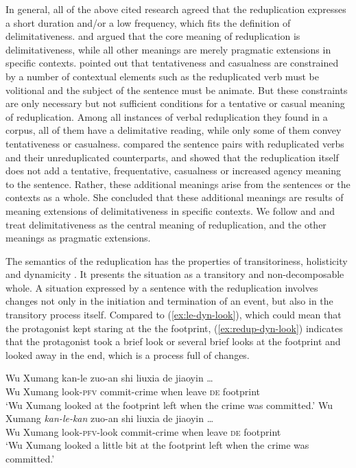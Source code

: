 In general, all of the above cited research agreed that the reduplication expresses a short duration and/or a low frequency, which fits the definition of delimitativeness.
\citet[152--154]{XiaoMcEnery2004} and \citet{Yang2003} argued that the core meaning of reduplication is delimitativeness, 
while all other meanings are merely pragmatic extensions  in specific contexts.
\citet[152--154]{XiaoMcEnery2004} pointed out that tentativeness and casualness are constrained by a number of contextual elements 
such as the reduplicated verb must be volitional and the subject of the sentence must be animate.
But these constraints are only necessary but not sufficient conditions for a tentative or casual meaning of reduplication.
Among all instances of verbal reduplication they found in a corpus, all of them have a delimitative reading, while only some of them convey tentativeness or casualness.
\citet{Yang2003} compared the sentence pairs with reduplicated verbs and their unreduplicated counterparts,
and showed that the reduplication itself does not add a tentative, frequentative, casualness or increased agency meaning to the sentence.
Rather, these additional meanings arise from the sentences or the contexts as a whole.
She concluded that these additional meanings are results of meaning extensions of delimitativeness in specific contexts.
We follow \citet{XiaoMcEnery2004} and \citet{Yang2003} and treat delimitativeness as the central meaning of reduplication,
and the other meanings as pragmatic extensions.

The semantics of the reduplication has the properties of transitoriness,  holisticity  and dynamicity \citetext{\citealp[70--79]{Dai1997}; \citealp[155--159]{XiaoMcEnery2004}}.
It presents the situation as a  transitory and non\hyp{}decomposable whole.
A situation expressed by a sentence with the reduplication involves changes not only in the initiation and termination of an event, but also in the transitory process itself.
Compared to (\ref{ex:le-dyn-look}), which could mean that the protagonist kept staring at the the footprint,
(\ref{ex:redup-dyn-look}) indicates that the protagonist took a brief look or several brief looks at the footprint and looked away in the end, which is a process full of changes.

\settowidth{}

\ea
  \ea\label{ex:le-dyn-look}
    \gll Wu Xumang kan-le zuo-an shi liuxia de jiaoyin \ldots\\ 
    Wu Xumang look-\textsc{pfv} commit-crime when leave \textsc{de} footprint\\ 
    \glt `Wu Xumang looked at the footprint left when the crime was committed.'
  \ex\label{ex:redup-dyn-look}
    \gll Wu Xumang \textit{kan-le-kan} zuo-an shi liuxia de jiaoyin \ldots\\
    Wu Xumang look-\textsc{pfv}-look commit-crime when leave \textsc{de} footprint\\ 
    \glt `Wu Xumang looked a little bit at the footprint left when the crime was committed.'
  \z
\z

